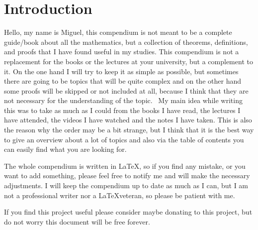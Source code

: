 \newpage
\section{Introduction}

Hello, my name is Miguel, this compendium is not meant to be a complete 
guide/book about all the mathematics,
but a collection of theorems, definitions, and proofs that I have found useful in my studies.
This compendium is not a replacement for the books or the lectures at your university, but a complement 
to it. On the one hand I will try to keep it as simple as possible, but sometimes there are going to be 
topics that will be quite complex and on the other hand some proofs will be skipped or not included at 
all, because I think that they are not necessary for the understanding of the topic.
\vspace{\baselineskip}
\
My main idea while writing this was to take as much as I could from the books I have read, the lectures 
I have attended, the videos I have watched 
and the notes I have taken. This is also the reason why the order may be a bit strange, 
but I think that it is the best way to give an overview about a lot of topics and also 
via the table of contents you can
easily find what you are looking for.
\vspace{\baselineskip}

The whole compendium is written in \LaTeX, so if you find any mistake, or you want to add something, please 
feel free to notify me and will make the necessary adjustments.
I will keep the compendium up to date as much as 
I can, but I am not a professional writer nor a \LaTeX veteran, so please be patient with me.
\vspace{\baselineskip}

If you find this project useful please consider maybe donating
to this project, but do not worry this document will be free forever.
